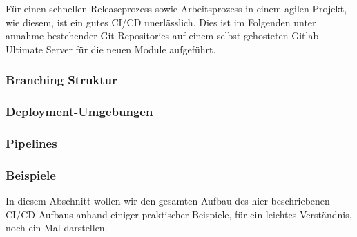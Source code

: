 Für einen schnellen Releaseprozess sowie Arbeitsprozess in einem agilen Projekt, wie diesem, ist ein gutes CI/CD unerlässlich.
Dies ist im Folgenden unter annahme bestehender Git Repositories auf einem selbst gehosteten Gitlab Ultimate Server für die neuen Module aufgeführt.

\subsubsection{Branching Struktur}
    

\subsubsection{Deployment-Umgebungen}\label{subsubsec:deployment-umgebungen}
    

\subsubsection{Pipelines}\label{subsubsec:pipelines}
    

\subsubsection{Beispiele}
    In diesem Abschnitt wollen wir den gesamten Aufbau des hier beschriebenen CI/CD Aufbaus anhand einiger praktischer Beispiele, für ein leichtes Verständnis, noch ein Mal darstellen.



